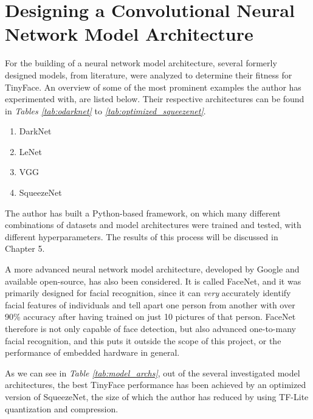 \section{Designing a Convolutional Neural Network Model Architecture}
For the building of a neural network model architecture, several formerly designed models, from literature, were analyzed to determine their fitness for TinyFace. An overview of some of the most prominent examples the author has experimented with, are listed below. Their respective architectures can be found in \textit{Tables \ref{tab:odarknet}} to \textit{\ref{tab:optimized_squeezenet}}.
\begin{enumerate}
    \item DarkNet \cite{tiny_darknet}
    \item LeNet \cite{lenet_1}
    \item VGG \cite{vgg_paper}
    \item SqueezeNet \cite{squeezent_paper}
\end{enumerate}

The author has built a Python-based framework, on which many different combinations of datasets and model architectures were trained and tested, with different hyperparameters. The results of this process will be discussed in Chapter 5. \par
A more advanced neural network model architecture, developed by Google and available open-source, has also been considered. It is called FaceNet, and it was primarily designed for facial recognition, since it can \textit{very} accurately identify facial features of individuals and tell apart one person from another with over 90\% accuracy after having trained on just 10 pictures of that person. FaceNet therefore is not only capable of face detection, but also advanced one-to-many facial recognition, and this puts it outside the scope of this project, or the performance of embedded hardware in general. \cite{facenetseminal_paper} \par
As we can see in \textit{Table \ref{tab:model_archs}}, out of the several investigated model architectures, the best TinyFace performance has been achieved by an optimized version of SqueezeNet, the size of which the author has reduced by using TF-Lite quantization and compression.


